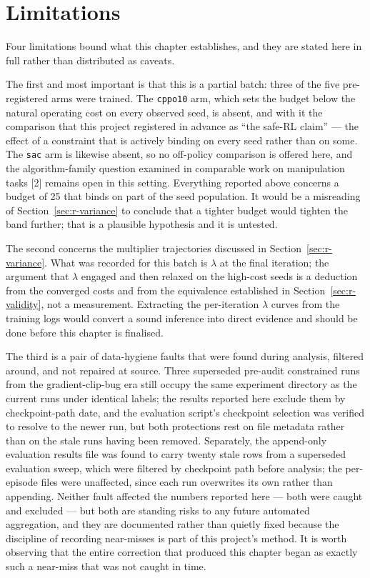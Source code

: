 
\section{Limitations}\label{sec:r-limits}

Four limitations bound what this chapter establishes, and they are stated here in full rather than
distributed as caveats.

The first and most important is that this is a partial batch: three of the five pre-registered arms
were trained. The \texttt{cppo10} arm, which sets the budget below the natural operating cost on every
observed seed, is absent, and with it the comparison that this project registered in advance as
``the safe-RL claim'' --- the effect of a constraint that is actively binding on every seed rather
than on some. The \texttt{sac} arm is likewise absent, so no off-policy comparison is offered here, and
the algorithm-family question examined in comparable work on manipulation tasks {[}2{]} remains open in
this setting. Everything reported above concerns a budget of 25 that binds on part of the seed
population. It would be a misreading of Section~\ref{sec:r-variance} to conclude that a tighter budget would tighten
the band further; that is a plausible hypothesis and it is untested.

The second concerns the multiplier trajectories discussed in Section~\ref{sec:r-variance}. What was recorded for
this batch is \(\lambda\) at the final iteration; the argument that \(\lambda\) engaged and then relaxed on the
high-cost seeds is a deduction from the converged costs and from the equivalence established in
Section~\ref{sec:r-validity}, not a measurement. Extracting the per-iteration \(\lambda\) curves from the training logs would
convert a sound inference into direct evidence and should be done before this chapter is
finalised.

The third is a pair of data-hygiene faults that were found during analysis, filtered around, and
not repaired at source. Three superseded pre-audit constrained runs from the gradient-clip-bug era
still occupy the same experiment directory as the current runs under identical labels; the results
reported here exclude them by checkpoint-path date, and the evaluation script's checkpoint
selection was verified to resolve to the newer run, but both protections rest on file metadata
rather than on the stale runs having been removed. Separately, the append-only evaluation results
file was found to carry twenty stale rows from a superseded evaluation sweep, which were filtered
by checkpoint path before analysis; the per-episode files were unaffected, since each run
overwrites its own rather than appending. Neither fault affected the numbers reported here --- both
were caught and excluded --- but both are standing risks to any future automated aggregation, and
they are documented rather than quietly fixed because the discipline of recording near-misses is
part of this project's method. It is worth observing that the entire correction that produced this
chapter began as exactly such a near-miss that was not caught in time.

